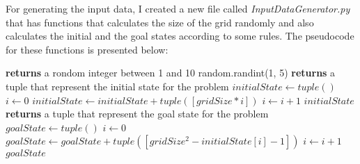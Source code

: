 \documentclass[14pt]{article}
\begin{document}
\vspace{2.5 mm}
For generating the input data, I created a new file called \textit{InputDataGenerator.py} that has functions that calculates the size of the grid randomly and also calculates the initial and the goal states according to some rules. The pseudocode for these functions is presented below:
\vspace{2.5 mm}
\begin{algorithmic}
 \textbf{returns} a rondom integer between 1 and 10
    \State \Return random.randint(1, 5)
\EndFunction
\vspace{2.5 mm}
 \textbf{returns} a tuple that represent the initial state for the problem
    \State $initialState \gets tuple()$
    \State $i \gets 0$
        \State $initialState \gets initialState + tuple([gridSize*i])$
        \State $i \gets i + 1$
    \EndWhile
    \State \Return $initialState$
\EndFunction
\vspace{2.5 mm}
 \textbf{returns} a tuple that represent the goal state for the problem
    \State $goalState \gets tuple()$
    \State $i \gets 0$
        \State $goalState \gets goalState + tuple([gridSize^2-initialState[i]-1])$
        \State $i \gets i + 1$
    \EndWhile
    \State \Return $goalState$
\EndFunction
\end{algorithmic}
\newpage
\end{document}
